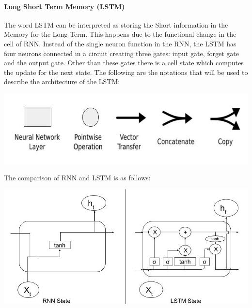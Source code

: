 \paragraph{Long Short Term Memory (LSTM)}

The word LSTM \cite{12} can be interpreted as storing the Short information in the Memory for the Long Term. This happens due to the functional change in the cell of RNN. Instead of the single neuron function in the RNN, the LSTM has four neurons connected in a circuit creating three gates: input gate, forget gate and the output gate. Other than these gates there is a cell state which computes the update for the next state. The following are the notations that will be used to describe the architecture of the LSTM:\\

				\begin{center}
				\includegraphics[width=\linewidth]{figures/Notations.jpg}	
				\label{fig: Notations}
				\end{center}

The comparison of RNN and LSTM is as follows:\\

				\begin{center}
				\includegraphics[width=\linewidth]{figures/Comparison-of-RNN-and-LSTM-Cells.jpg}	
				\label{fig: Comparison of RNN and LSTM State}
				\end{center}

